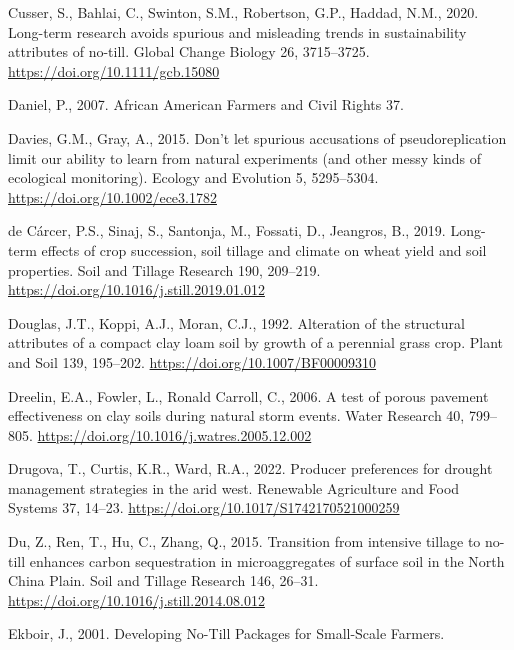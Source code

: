 \documentclass[
  12pt,
]{article}
\newlength{\cslhangindent}
\newlength{\cslentryspacingunit} %
\newenvironment{CSLReferences}[2] %
 {%
  \setlength{\parindent}{0pt}
  \ifodd #1
  \let\oldpar\par
  \def\par{\hangindent=\cslhangindent\oldpar}
  \fi
  \setlength{\parskip}{#2\cslentryspacingunit}
 }%
 {}
\begin{document}
\begin{CSLReferences}{1}{0}
\leavevmode{}%
Cusser, S., Bahlai, C., Swinton, S.M., Robertson, G.P., Haddad, N.M., 2020. Long-term research avoids spurious and misleading trends in sustainability attributes of no-till. Global Change Biology 26, 3715--3725. \url{https://doi.org/10.1111/gcb.15080}

\leavevmode{}%
Daniel, P., 2007. African {American Farmers} and {Civil Rights} 37.

\leavevmode{}%
Davies, G.M., Gray, A., 2015. Don't let spurious accusations of pseudoreplication limit our ability to learn from natural experiments (and other messy kinds of ecological monitoring). Ecology and Evolution 5, 5295--5304. \url{https://doi.org/10.1002/ece3.1782}

\leavevmode{}%
de Cárcer, P.S., Sinaj, S., Santonja, M., Fossati, D., Jeangros, B., 2019. Long-term effects of crop succession, soil tillage and climate on wheat yield and soil properties. Soil and Tillage Research 190, 209--219. \url{https://doi.org/10.1016/j.still.2019.01.012}

\leavevmode{}%
Douglas, J.T., Koppi, A.J., Moran, C.J., 1992. Alteration of the structural attributes of a compact clay loam soil by growth of a perennial grass crop. Plant and Soil 139, 195--202. \url{https://doi.org/10.1007/BF00009310}

\leavevmode{}%
Dreelin, E.A., Fowler, L., Ronald Carroll, C., 2006. A test of porous pavement effectiveness on clay soils during natural storm events. Water Research 40, 799--805. \url{https://doi.org/10.1016/j.watres.2005.12.002}

\leavevmode{}%
Drugova, T., Curtis, K.R., Ward, R.A., 2022. Producer preferences for drought management strategies in the arid west. Renewable Agriculture and Food Systems 37, 14--23. \url{https://doi.org/10.1017/S1742170521000259}

\leavevmode{}%
Du, Z., Ren, T., Hu, C., Zhang, Q., 2015. Transition from intensive tillage to no-till enhances carbon sequestration in microaggregates of surface soil in the {North China Plain}. Soil and Tillage Research 146, 26--31. \url{https://doi.org/10.1016/j.still.2014.08.012}

\leavevmode{}%
Ekboir, J., 2001. Developing {No-Till Packages} for {Small-Scale Farmers}.


\end{CSLReferences}
\end{document}
